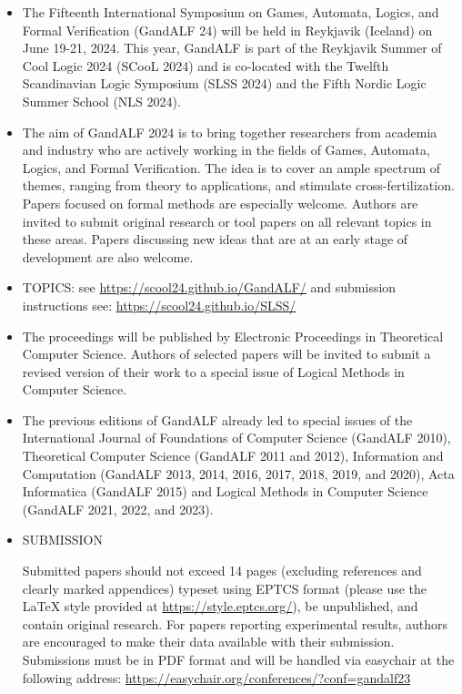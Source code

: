 \documentclass[prodmode,acmtecs]{acmsmall} %
\begin{document}
\begin{itemize}\item  The Fifteenth International Symposium on Games, Automata, Logics, and Formal Verification (GandALF 24) will be held in Reykjavik (Iceland) on June 19-21, 2024. This year, GandALF is part of the Reykjavik Summer of Cool Logic 2024 (SCooL 2024) and is co-located with the Twelfth Scandinavian Logic Symposium (SLSS 2024) and the Fifth Nordic Logic Summer School (NLS 2024). 
 
\item  The aim of GandALF 2024 is to bring together researchers from academia and industry who are actively working in the fields of Games, Automata, Logics, and Formal Verification. The idea is to cover an ample spectrum of themes, ranging from theory to applications, and stimulate cross-fertilization. Papers focused on formal methods are especially welcome. Authors are invited to submit original research or tool papers on all relevant topics in these areas. Papers discussing new ideas that are at an early stage of development are also welcome. 
 
\item  TOPICS: see \href{https://scool24.github.io/GandALF/}{https://scool24.github.io/GandALF/} and submission instructions see: \href{https://scool24.github.io/SLSS/}{https://scool24.github.io/SLSS/} 
 
\item  The proceedings will be published by Electronic Proceedings in Theoretical Computer Science. Authors of selected papers will be invited to submit a revised version of their work to a special issue of Logical Methods in Computer Science. 
 
\item  The previous editions of GandALF already led to special issues of the International Journal of Foundations of Computer Science (GandALF 2010), Theoretical Computer Science (GandALF 2011 and 2012), Information and Computation (GandALF 2013, 2014, 2016, 2017, 2018, 2019, and 2020), Acta Informatica (GandALF 2015) and Logical Methods in Computer Science (GandALF 2021, 2022, and 2023). 
 
\item  SUBMISSION  
 
  Submitted papers should not exceed 14 pages (excluding references and clearly marked appendices) typeset using EPTCS format (please use the LaTeX style provided at \href{https://style.eptcs.org/}{https://style.eptcs.org/}), be unpublished, and contain original research. For papers reporting experimental results, authors are encouraged to make their data available with their submission. Submissions must be in PDF format and will be handled via easychair at the following address: \href{https://easychair.org/conferences/?conf=gandalf23}{https://easychair.org/conferences/?conf=gandalf23}  
 

\end{itemize}
\end{document}
